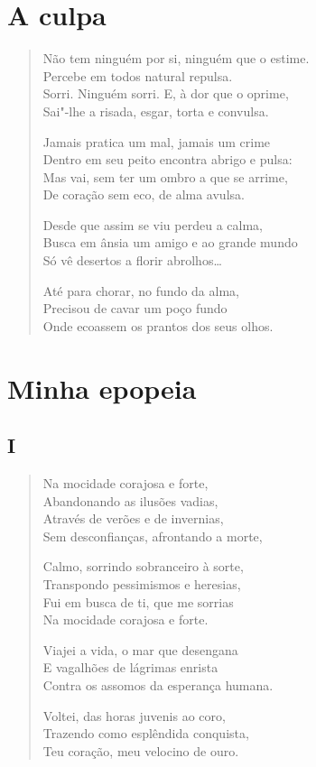 \chapter{A culpa}

\begin{verse}
Não tem ninguém por si, ninguém que o estime.\\
Percebe em todos natural repulsa.\\
Sorri. Ninguém sorri. E, à dor que o oprime,\\
Sai"-lhe a risada, esgar, torta e convulsa.

Jamais pratica um mal, jamais um crime\\
Dentro em seu peito encontra abrigo e pulsa:\\
Mas vai, sem ter um ombro a que se arrime,\\
De coração sem eco, de alma avulsa.

Desde que assim se viu perdeu a calma,\\
Busca em ânsia um amigo e ao grande mundo\\
Só vê desertos a florir abrolhos\ldots{}

Até para chorar, no fundo da alma,\\
Precisou de cavar um poço fundo\\
Onde ecoassem os prantos dos seus olhos.
\end{verse}

\chapter{Minha epopeia}

\section*{I}

\begin{verse}
Na mocidade corajosa e forte,\\
Abandonando as ilusões vadias,\\
Através de verões e de invernias,\\
Sem desconfianças, afrontando a morte,

Calmo, sorrindo sobranceiro à sorte,\\
Transpondo pessimismos e heresias,\\
Fui em busca de ti, que me sorrias\\
Na mocidade corajosa e forte.

Viajei a vida, o mar que desengana\\
E vagalhões de lágrimas enrista\\
Contra os assomos da esperança humana.

Voltei, das horas juvenis ao coro,\\
Trazendo como esplêndida conquista,\\
Teu coração, meu velocino de ouro.
\end{verse}

